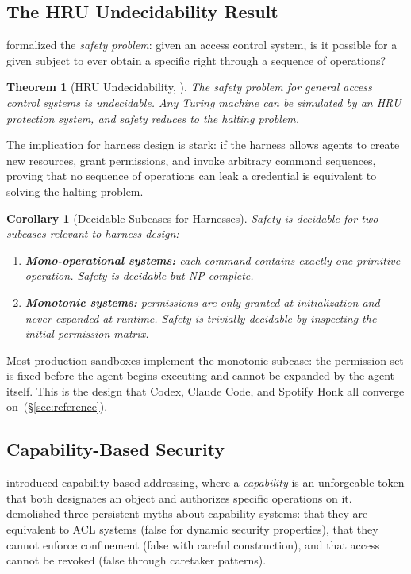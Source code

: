 \documentclass[11pt, a4paper, copyright]{googledeepmind}
\newtheorem{theorem}{Theorem}[section]
\newtheorem{corollary}{Corollary}[section]
\begin{document}
\subsection{The HRU Undecidability Result}

\citet{harrison1976protection} formalized the \emph{safety problem}: given an access control system, is it possible for a given subject to ever obtain a specific right through a sequence of operations?

\begin{theorem}[HRU Undecidability, \citealp{harrison1976protection}]
\label{thm:hru}
The safety problem for general access control systems is undecidable. Any Turing machine can be simulated by an HRU protection system, and safety reduces to the halting problem.
\end{theorem}

The implication for harness design is stark: if the harness allows agents to create new resources, grant permissions, and invoke arbitrary command sequences, proving that no sequence of operations can leak a credential is equivalent to solving the halting problem.

\begin{corollary}[Decidable Subcases for Harnesses]
\label{cor:decidable}
Safety is decidable for two subcases relevant to harness design:
\begin{enumerate}
    \item \textbf{Mono-operational systems:} each command contains exactly one primitive operation. Safety is decidable but NP-complete.
    \item \textbf{Monotonic systems:} permissions are only granted at initialization and never expanded at runtime. Safety is trivially decidable by inspecting the initial permission matrix.
\end{enumerate}
\end{corollary}

Most production sandboxes implement the monotonic subcase: the permission set is fixed before the agent begins executing and cannot be expanded by the agent itself. This is the design that Codex, Claude Code, and Spotify Honk all converge on~(\S\ref{sec:reference}).

\subsection{Capability-Based Security}

\citet{dennis1966programming} introduced capability-based addressing, where a \emph{capability} is an unforgeable token that both designates an object and authorizes specific operations on it. \citet{miller2003myths} demolished three persistent myths about capability systems: that they are equivalent to ACL systems (false for dynamic security properties), that they cannot enforce confinement (false with careful construction), and that access cannot be revoked (false through caretaker patterns).
\end{document}

